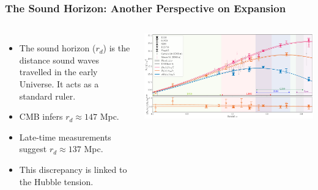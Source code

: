 \documentclass[aspectratio=169]{beamer}
\begin{document}
\begin{frame}
    \frametitle{The Sound Horizon: Another Perspective on Expansion}
    \begin{columns}
        \begin{itemize}
            \item The sound horizon ($r_d$) is the distance sound waves travelled in the early Universe. It acts as a standard ruler.
            \item CMB infers $r_d \approx 147$ Mpc. 
            \item Late-time measurements suggest $r_d \approx 137$ Mpc.
            \item This discrepancy is linked to the Hubble tension.
        \end{itemize}
        \includegraphics[width=\textwidth]{figures/BAO_CosmoVerse_HubbleDiag_2D_final.pdf}
    \end{columns}
\end{frame}
\end{document}
